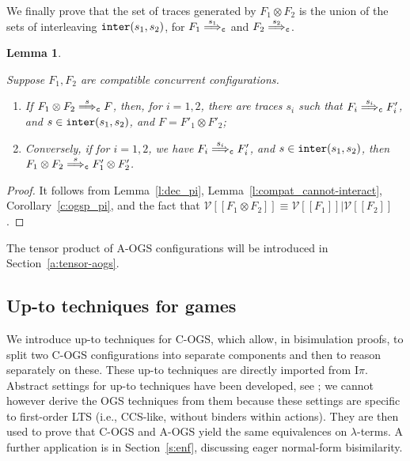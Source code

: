 \documentclass[11pt,a4paper]{amsart}
\theoremstyle{plain}
\theoremstyle{definition}
\theoremstyle{defC}
\theoremstyle{thmC}
\theoremstyle{plain}
\numberwithin{equation}{section}
\newif\iflong\longtrue
\newcommand{\trace}{s}
\newcommand{\AOGS}{\mbox{{\rm A-OGS}}\xspace}      %
\newcommand{\COGS}{\mbox{{\rm C-OGS}}\xspace}      %
\newcommand{\appendCon}[2]{#1 \otimes #2}
\newcommand{\rmm}[1]{{\tt{\lowercase{#1}}}}
\newcommand{\genArr}[2]{\mathrel{\stackrel{{#1}}{\Longrightarrow}_{\rmm{\lowercase{#2}}}}}  %
\newcommand{\ArrC}[1]{\genArr{#1}{C}}   %
\newcommand{\interl}[2]{{\tt inter}( #1, #2)}
\newcommand{\FF}{F}
\newcommand{\cbvSymb}{{\mathcal {V}}}
\newcommand{\encoEnvI}[1]{ \cbvSymb[\! [ #1 ] \! ]  } %
\newcommand{\encoConI}{\encoEnvI} %
\newcommand{\Intp}{\mbox{I$\pi$}\xspace}   %
\newcommand{\piI}{\Intp}   %
\theoremstyle{plain}
\newtheorem{lemma}[thm]{Lemma}
\theoremstyle{definition}
\begin{document}
\noindent
We finally prove that the set of traces generated by $\FF_1 \otimes \FF_2$
is the  union of the sets of interleaving $\interl{\trace_1}{\trace_2}$,
for $\FF_1 \ArrC{\trace_1}$ and $\FF_2 \ArrC{\trace_2}$.
\begin{lemma}
\label{l:COGS-interleave-tensor}
\iflong
Suppose $\FF_1,\FF_2$ are compatible concurrent configurations.
\begin{enumerate}
\item\label{l:COGS-interleave-tensor_1}
If $\appendCon
 {\FF_1} {\FF_2} \ArrC \trace  \FF  $, then, 
for $i=1,2$,  there are traces $ \trace_i $
such that $ {\FF_i} \ArrC { \trace_i} \FF'_i $, and $ \trace  
\in   \interl { \trace_1   }{ \trace_2 }$, and 
$\FF = \appendCon
 {\FF'_1} {\FF'_2}$;
\item\label{l:COGS-interleave-tensor_2}
Conversely,
if for  $i=1,2$, we have
 $ {\FF_i} \ArrC { \trace_i} \FF'_i$,
and
$ \trace  
\in   \interl { \trace_1   }{ \trace_2 }$, 
then 
$ 
\appendCon
{\FF_1} {\FF_2} \ArrC \trace   \appendCon
 {\FF'_1} {\FF'_2}$.
\end{enumerate}
\fi
\end{lemma}  

\begin{proof}
  It follows from Lemma~\ref{l:dec_pi}, 
  Lemma~\ref{l:compat_cannot-interact},
  Corollary~\ref{c:ogsp_pi}, and the fact that
  $\encoConI {
  \appendCon
  {\FF_1} {\FF_2}}
  \equiv 
  \encoConI {
  \FF_1}
  |
  \encoConI {
  {\FF_2}}$.
\end{proof}

\noindent
The tensor product of \AOGS configurations will be introduced
in Section~\ref{a:tensor-aogs}.



\subsection{Up-to techniques for games}
\label{ss:upto_games}

We introduce up-to techniques for \COGS, which allow, in bisimulation proofs, 
to split two \COGS configurations  
into separate components and then to reason separately on these.
These up-to techniques are directly imported from \piI.
Abstract settings for up-to techniques have been developed, see
\cite{SanPous,PousS19}; we cannot however derive the OGS techniques from
them because these settings are specific to first-order LTS (i.e., CCS-like, 
without binders within actions). 
%
They are then used to prove that
\COGS and \AOGS yield the same equivalences on
$\lambda$-terms.
A further application is in Section~\ref{s:enf}, 
discussing eager normal-form bisimilarity. 
\end{document}
